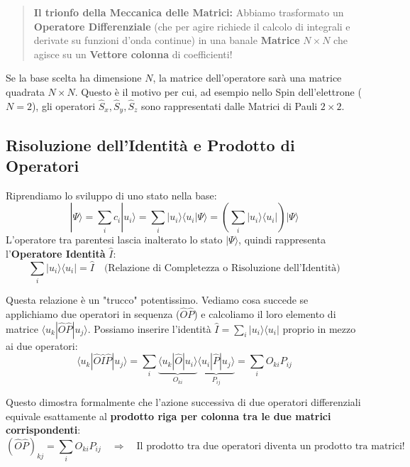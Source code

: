 \documentclass[11pt, a4paper]{article}
\begin{document}
\begin{quote}
    \textbf{Il trionfo della Meccanica delle Matrici:} %
    Abbiamo trasformato un \textbf{Operatore Differenziale} (che per agire richiede il calcolo di integrali e derivate su funzioni d'onda continue) in una banale \textbf{Matrice} $N \times N$ che agisce su un \textbf{Vettore colonna} di coefficienti! %
\end{quote}
Se la base scelta ha dimensione $N$, la matrice dell'operatore sarà una matrice quadrata $N \times N$. Questo è il motivo per cui, ad esempio nello Spin dell'elettrone ($N=2$), gli operatori $\hat{S}_x, \hat{S}_y, \hat{S}_z$ sono rappresentati dalle Matrici di Pauli $2 \times 2$. %


\subsection{Risoluzione dell'Identità e Prodotto di Operatori} %

Riprendiamo lo sviluppo di uno stato nella base: %
\begin{equation*}
    |\Psi\rangle = \sum_i c_i |u_i\rangle = \sum_i |u_i\rangle \langle u_i|\Psi\rangle = \left( \sum_i |u_i\rangle \langle u_i| \right) |\Psi\rangle %
\end{equation*}
L'operatore tra parentesi lascia inalterato lo stato $|\Psi\rangle$, quindi rappresenta l'\textbf{Operatore Identità} $\hat{I}$: %
\begin{equation}
    \boxed{ \sum_i |u_i\rangle \langle u_i| = \hat{I} } \quad \text{(Relazione di Completezza o Risoluzione dell'Identità)} %
\end{equation}

\noindent
Questa relazione è un "trucco" potentissimo. Vediamo cosa succede se applichiamo due operatori in sequenza ($\hat{O}\hat{P}$) e calcoliamo il loro elemento di matrice $\langle u_k | \hat{O}\hat{P} | u_j \rangle$. %
Possiamo inserire l'identità $\hat{I} = \sum_i |u_i\rangle \langle u_i|$ proprio in mezzo ai due operatori: %
\begin{equation*}
    \langle u_k | \hat{O} \hat{I} \hat{P} | u_j \rangle = \sum_i \underbrace{ \langle u_k | \hat{O} | u_i \rangle }_{O_{ki}} \underbrace{ \langle u_i | \hat{P} | u_j \rangle }_{P_{ij}} = \sum_i O_{ki} P_{ij} %
\end{equation*}

\noindent
Questo dimostra formalmente che l'azione successiva di due operatori differenziali equivale esattamente al \textbf{prodotto riga per colonna tra le due matrici corrispondenti}: %
\begin{equation}
    (\hat{O}\hat{P})_{kj} = \sum_i O_{ki} P_{ij} \quad \Rightarrow \quad \text{Il prodotto tra due operatori diventa un prodotto tra matrici!} %
\end{equation}
\end{document}
